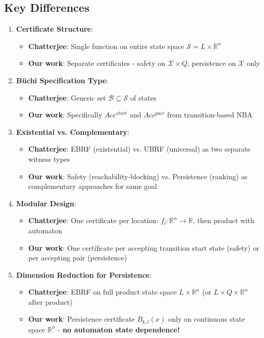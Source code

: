 \documentclass{article}
\begin{document}
\begin{enumerate}
\subsection{Key Differences}

\begin{enumerate}
    \item \textbf{Certificate Structure}:
    \begin{itemize}
        \item \textbf{Chatterjee}: Single function on entire state space $\mathcal{S} = L \times \mathbb{R}^n$
        \item \textbf{Our work}: Separate certificates - safety on $\mathcal{X} \times Q$, persistence on $\mathcal{X}$ only
    \end{itemize}

    \item \textbf{Büchi Specification Type}:
    \begin{itemize}
        \item \textbf{Chatterjee}: Generic set $\mathcal{B} \subseteq \mathcal{S}$ of states
        \item \textbf{Our work}: Specifically $Acc^{start}$ and $Acc^{pair}$ from transition-based NBA
    \end{itemize}

    \item \textbf{Existential vs. Complementary}:
    \begin{itemize}
        \item \textbf{Chatterjee}: EBRF (existential) vs. UBRF (universal) as two separate witness types
        \item \textbf{Our work}: Safety (reachability-blocking) vs. Persistence (ranking) as complementary approaches for same goal
    \end{itemize}

    \item \textbf{Modular Design}:
    \begin{itemize}
        \item \textbf{Chatterjee}: One certificate per location: $f_l: \mathbb{R}^n \rightarrow \mathbb{R}$, then product with automaton
        \item \textbf{Our work}: One certificate per accepting transition start state (safety) or per accepting pair (persistence)
    \end{itemize}

    \item \textbf{Dimension Reduction for Persistence}:
    \begin{itemize}
        \item \textbf{Chatterjee}: EBRF on full product state space $L \times \mathbb{R}^n$ (or $L \times Q \times \mathbb{R}^n$ after product)
        \item \textbf{Our work}: Persistence certificate $B_{k,l}(x)$ only on continuous state space $\mathbb{R}^n$ - \textbf{no automaton state dependence!}
    \end{itemize}


\end{enumerate}
\end{enumerate}
\end{document}
